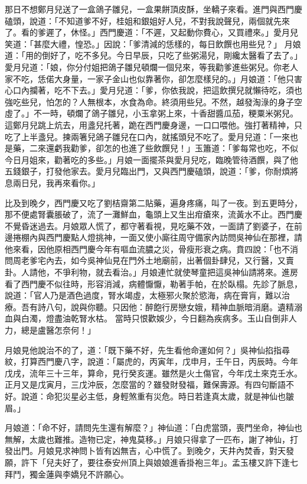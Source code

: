 那日不想鄭月兒送了一盒鴿子雛兒，一盒果餅頂皮酥，坐轎子來看。進門與西門慶磕頭，說道：「不知道爹不好，桂姐和銀姐好人兒，不對我說聲兒，兩個就先來了。看的爹遲了，休怪。」西門慶道：「不遲，又起動你費心，又買禮來。」愛月兒笑道：「甚麼大禮，惶恐。」因說：「爹清減的恁樣的，每日飲饌也用些兒？」 月娘道：「用的倒好了，吃不多兒。今日早辰，只吃了些粥湯兒，剛纔太醫看了去了。」愛月兒道：「娘，你分付姐把鴿子雛兒頓爛一個兒來，等我勸爹進些粥兒。你老人家不吃，恁偌大身量，一家子金山也似靠著你，卻怎麼樣兒的。」月娘道：「他只害心口內攔著，吃不下去。」愛月兒道：「爹，你依我說，把這飲撰兒就懶待吃，須也強吃些兒，怕怎的？人無根本，水食為命。終須用些兒。不然，越發淘淥的身子空虛了。」不一時，頓爛了鴿子雛兒，小玉拿粥上來，十香甜醬瓜茄，粳粟米粥兒。這鄭月兒跳上炕去，用盞兒托著，跪在西門慶身邊，一口口喂他。強打著精神，只吃了上半盞兒。揀兩箸兒鴿子雛兒在口內，就搖頭兒不吃了。愛月兒道：「一來也是藥，二來還虧我勸爹，卻怎的也進了些飲饌兒！」玉簫道：「爹每常也吃，不似今日月姐來，勸著吃的多些。」月娘一面擺茶與愛月兒吃，臨晚管待酒饌，與了他五錢銀子，打發他家去。愛月兒臨出門，又與西門慶磕頭，說道：「爹，你耐煩將息兩日兒，我再來看你。」

比及到晚夕，西門慶又吃了劉桔齋第二貼藥，遍身疼痛，叫了一夜。到五更時分，那不便處腎囊脹破了，流了一灘鮮血，龜頭上又生出疳瘡來，流黃水不止。西門慶不覺昏迷過去。月娘眾人慌了，都守著看視，見吃藥不效，一面請了劉婆子，在前邊捲棚內與西門慶點人燈挑神，一面又使小廝往周守備家內訪問吳神仙在那裡，請他來看，因他原相西門慶今年有嘔血流膿之災，骨瘦形衰之病。賁四說：「也不消問周老爹宅內去，如今吳神仙見在門外土地廟前，出著個卦肆兒，又行醫，又賣卦。人請他，不爭利物，就去看治。」月娘連忙就使琴童把這吳神仙請將來。進房看了西門慶不似往時，形容消減，病體懨懨，勒著手帕，在於臥榻。先診了脈息，說道：「官人乃是酒色過度，腎水竭虛，太極邪火聚於慾海，病在膏肓，難以治療。吾有詩八句，說與你聽。只因他：醉飽行房戀女娥，精神血脈暗消磨。遺精溺血與白濁，燈盡油乾腎水枯。 當時只恨歡娛少，今日翻為疾病多。玉山自倒非人力，總是盧醫怎奈何！」

月娘見他說治不的了，道：「既下藥不好，先生看他命運如何？」吳神仙掐指尋紋，打算西門慶八字，說道：「屬虎的，丙寅年，戊申月，壬午日，丙辰時。今年戊戌，流年三十三年，算命，見行癸亥運。雖然是火土傷官，今年戊土來克壬水。正月又是戊寅月，三戊沖辰，怎麼當的？雖發財發福，難保壽源。有四句斷語不好。說道：命犯災星必主低，身輕煞重有災危。時日若逢真太歲，就是神仙也皺眉。」

月娘道：「命不好，請問先生還有解麼？」神仙道：「白虎當頭，喪門坐命，神仙也無解，太歲也難推。造物已定，神鬼莫移。」月娘只得拿了一匹布，謝了神仙，打發出門。月娘見求神問卜皆有凶無吉，心中慌了。到晚夕，天井內焚香，對天發願，許下「兒夫好了，要往泰安州頂上與娘娘進香掛袍三年」。孟玉樓又許下逢七拜鬥，獨金蓮與李嬌兒不許願心。

